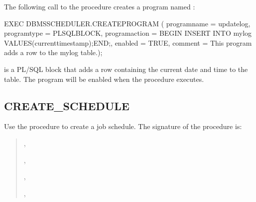 \documentclass[letterpaper,10pt,english,openany,oneside]{sphinxmanual}
\begin{document}
\newpage


The following call to the  procedure creates a program
named :

%
\begin{sphinxVerbatim}[commandchars=\\\{\}]
EXEC
  DBMS\PYGZus{}SCHEDULER.CREATE\PYGZus{}PROGRAM (
program\PYGZus{}name     =\PYGZgt{} \PYGZsq{}update\PYGZus{}log\PYGZsq{},
    program\PYGZus{}type     =\PYGZgt{} \PYGZsq{}PLSQL\PYGZus{}BLOCK\PYGZsq{},
    program\PYGZus{}action   =\PYGZgt{} \PYGZsq{}BEGIN INSERT INTO my\PYGZus{}log VALUES(current\PYGZus{}timestamp);END;\PYGZsq{},
    enabled          =\PYGZgt{} TRUE,
    comment          =\PYGZgt{} \PYGZsq{}This program adds a row to the my\PYGZus{}log table.\PYGZsq{});
\end{sphinxVerbatim}

 is a PL/SQL block that adds a row containing the current
date and time to the  table. The program will be enabled when the
 procedure executes.

\newpage


\subsection{CREATE\_SCHEDULE}
\label{\detokenize{create_schedule::doc}}\label{\detokenize{create_schedule:create-schedule}}
Use the  procedure to create a job schedule. The
signature of the  procedure is:
\begin{quote}

\begin{DUlineblock}{0em}
\item[] 
\item[] ,
\item[] ,
\item[] ,
\item[] ,
\item[] 
\end{DUlineblock}
\end{quote}
\end{document}
